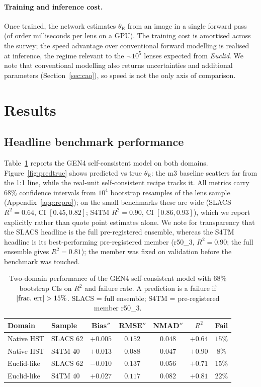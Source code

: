\documentclass[fleqn,usenatbib]{mnras}
\newcommand{\thetaE}{\theta_{\mathrm{E}}}
\begin{document}
\paragraph*{Training and inference cost.}
Once trained, the network estimates $\thetaE$ from an image in a single forward
pass (of order milliseconds per lens on a GPU). The training cost is amortised
across the survey; the speed advantage over conventional forward modelling
\citep[${\approx}3$~min per lens;][]{Cao2025} is realised at inference, the
regime relevant to the ${\sim}10^5$ lenses expected from \textit{Euclid}. We
note that conventional modelling also returns uncertainties and additional
parameters (Section~\ref{sec:cao}), so speed is not the only axis of comparison.

\section{Results}
\label{sec:results}

\subsection{Headline benchmark performance}
Table~\ref{tab:headline} reports the GEN4 self-consistent model on both
domains. Figure~\ref{fig:predtrue} shows predicted vs true $\thetaE$: the m3
baseline scatters far from the 1:1 line, while the real-unit self-consistent
recipe tracks it. All metrics carry $68\%$ confidence intervals from $10^4$
bootstrap resamples of the lens sample (Appendix~\ref{app:repro}); on the small
benchmarks these are wide (SLACS $R^2=0.64$, CI $[0.45,0.82]$; S4TM
$R^2=0.90$, CI $[0.86,0.93]$), which we report explicitly rather than quote
point estimates alone. We note for transparency that the SLACS headline is the
full pre-registered ensemble, whereas the S4TM headline is its best-performing
pre-registered member (r50\_3, $R^2=0.90$; the full ensemble gives $R^2=0.81$);
the member was fixed on validation before the benchmark was touched.

\begin{table}
\centering
\caption{Two-domain performance of the GEN4 self-consistent model with $68\%$
bootstrap CIs on $R^2$ and failure rate. A prediction is a failure if
$|{\rm frac.\ err}|>15\%$. SLACS = full ensemble; S4TM = pre-registered member
r50\_3.}
\label{tab:headline}
\begin{tabular}{llccccc}
\toprule
Domain & Sample & Bias$''$ & RMSE$''$ & NMAD$''$ & $R^2$ & Fail \\
\midrule
Native HST   & SLACS 62 & $+0.005$ & $0.152$ & $0.048$ & $+0.64$ & $15\%$ \\
Native HST   & S4TM 40  & $+0.013$ & $0.088$ & $0.047$ & $+0.90$ & $8\%$  \\
Euclid-like  & SLACS 62 & $-0.010$ & $0.137$ & $0.056$ & $+0.71$ & $15\%$ \\
Euclid-like  & S4TM 40  & $+0.027$ & $0.117$ & $0.082$ & $+0.81$ & $22\%$ \\
\bottomrule
\end{tabular}
\end{table}
\end{document}
